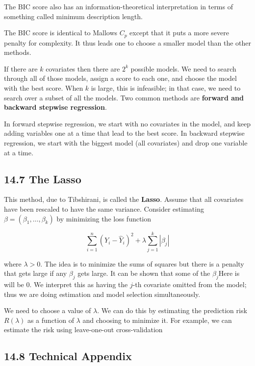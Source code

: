 The BIC score also has an information-theoretical interpretation in
terms of something called minimum description length.

The BIC score is identical to Mallows \(C_p\) except that it puts a more
severe penalty for complexity. It thus leads one to choose a smaller
model than the other methods.

If there are \(k\) covariates then there are \(2^{k}\) possible models. We
need to search through all of those models, assign a score to each one,
and choose the model with the best score. When \(k\) is large, this is
infeasible; in that case, we need to search over a subset of all the
models. Two common methods are \textbf{forward and backward stepwise
regression}.

In forward stepwise regression, we start with no covariates in the
model, and keep adding variables one at a time that lead to the best
score. In backward stepwise regression, we start with the biggest model
(all covariates) and drop one variable at a time.

\subsection*{14.7 The Lasso}\label{the-lasso}

This method, due to Tibshirani, is called the \textbf{Lasso}. Assume
that all covariates have been rescaled to have the same variance.
Consider estimating \(\beta = (\beta_{1}, \dots, \beta_{k})\) by minimizing
the loss function

\[ \sum_{i=1}^{n} (Y_{i} - \hat{Y}_{i})^{2} + \lambda \sum_{j=1}^{k} | \beta_{j} |\]

where \(\lambda > 0\). The idea is to minimize the sums of squares but
there is a penalty that gets large if any \(\beta_{j}\) gets large. It can
be shown that some of the \(\beta_{j}\)Here is will be 0. We interpret this as
having the \(j\)-th covariate omitted from the model; thus we are doing
estimation and model selection simultaneously.

We need to choose a value of \(\lambda\). We can do this by estimating
the prediction risk \(R(\lambda)\) as a function of \(\lambda\) and
choosing to minimize it. For example, we can estimate the risk using
leave-one-out cross-validation

\subsection*{14.8 Technical Appendix}

